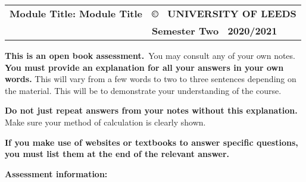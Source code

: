 \documentclass[12pt]{article}
\def\semester{Semester Two}
\def\session{2020/2021}
\def\module{Module Title} %
\begin{document}
	
	\normalsize
	\vspace{3mm}
	
	{\renewcommand{\arraystretch}{1.5}
		\begin{tabular}[h]{p{9cm}p{7cm}}
			{\bf Module Title: \module}\vspace{2cm} %
			& {\bf \copyright ~ UNIVERSITY OF LEEDS} \\
			\noindent{\bf School of Physics and Astronomy} & {\bf \semester ~ \session}\\ 
		\end{tabular}
	}
	
	\vspace*{1.5cm}
	
	
	\textbf{This is an open book assessment.} You may consult any of your own notes.
	\textbf{You must provide an explanation for all your answers in your own words.}
	This will vary from a few words to two to three sentences depending on the material. This will be to demonstrate your understanding of the course.
	
	\textbf{Do not just repeat answers from your notes without this explanation.}
	Make sure your method of calculation is clearly shown.  
	
	\textbf{If you make use of websites or textbooks to answer specific questions, you must list them at the end of the relevant answer.}
	
	\textbf{Assessment information:}
	
\end{document}
